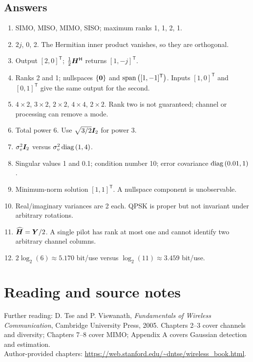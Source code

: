 \subsection*{Answers}
\begin{enumerate}[label=\textbf{E\arabic*.}]
\item SIMO, MISO, MIMO, SISO; maximum ranks 1, 1, 2, 1.
\item $2j$, 0, 2. The Hermitian inner product vanishes, so they are orthogonal.
\item Output $[2,0]^{\mathsf T}$; $\frac12{\bm{H}}^{\mathsf{H}}$ returns $[1,-j]^{\mathsf T}$.
\item Ranks 2 and 1; nullspaces $\{\bm{0}\}$ and $\operatorname{span}\left([1,-1]^{\mathsf T}\right)$. Inputs $[1,0]^{\mathsf T}$ and $[0,1]^{\mathsf T}$ give the same output for the second.
\item $4\times2$, $3\times2$, $2\times2$, $4\times4$, $2\times2$. Rank two is not guaranteed; channel or processing can remove a mode.
\item Total power 6. Use $\sqrt{3/2}\bm{I}_2$ for power 3.
\item $\sigma_v^2\bm{I}_2$ versus $\sigma_v^2\operatorname{diag}\left(1,4\right)$.
\item Singular values 1 and 0.1; condition number 10; error covariance $\operatorname{diag}\left(0.01,1\right)$.
\item Minimum-norm solution $[1,1]^{\mathsf T}$. A nullspace component is unobservable.
\item Real/imaginary variances are 2 each. QPSK is proper but not invariant under arbitrary rotations.
\item $\widehat{\bm{H}}=\bm{Y}/2$. A single pilot has rank at most one and cannot identify two arbitrary channel columns.
\item $2\log_2(6)\approx5.170$ bit/use versus $\log_2(11)\approx3.459$ bit/use.
\end{enumerate}

\section*{Reading and source notes}
Further reading: D. Tse and P. Viswanath, \emph{Fundamentals of Wireless Communication}, Cambridge University Press, 2005. Chapters 2--3 cover channels and diversity; Chapters 7--8 cover MIMO; Appendix A covers Gaussian detection and estimation.\\ Author-provided chapters: \url{https://web.stanford.edu/~dntse/wireless_book.html}.




